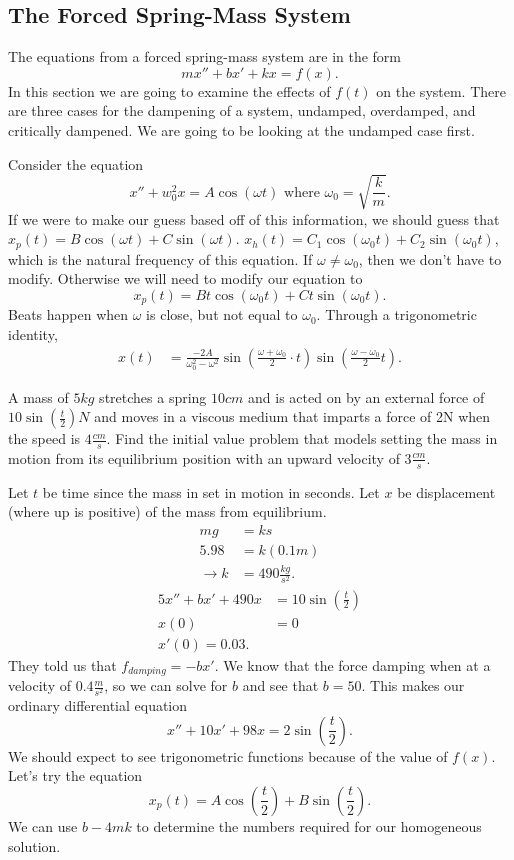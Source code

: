 \subsection{The Forced Spring-Mass System}

The equations from a forced spring-mass system are in the form 
\[
  mx''+bx'+kx=f(x)
.\] 
In this section we are going to examine the effects of $f(t)$ on the system. There are three cases for the dampening of a system, undamped, overdamped, and critically dampened. We are going to be looking at the undamped case first.
\begin{eg}
  Consider the equation 
  \[
    x''+w_0^2x=A\cos(\omega t) \text{ where $\omega_0=\sqrt{\frac{k}{m}} $}
  .\] 
  If we were to make our guess based off of this information, we should guess that $x_p(t)=B\cos(\omega t) + C\sin(\omega t)$. $x_h(t)=C_1\cos(\omega_0 t)+C_2\sin(\omega_0 t)$, which is the natural frequency of this equation. If $\omega\neq\omega_0$, then we don't have to modify. Otherwise we will need to modify our equation to 
  \[
    x_p(t)=Bt\cos(\omega_0 t)+Ct\sin(\omega_0 t)
  .\] 
  Beats happen when $\omega$ is close, but not equal to $\omega_0$. Through a trigonometric identity,
  \begin{align*}
    x(t)&=\frac{-2A}{\omega_0^2-\omega^2}\sin\left( \frac{\omega+\omega_0}{2}\cdot t \right) \sin\left( \frac{\omega-\omega_0}{2}t \right)
  .\end{align*}
\end{eg}
\begin{eg}
  A mass of $5kg$ stretches a spring $10cm$ and is acted on by an external force of $10\sin\left( \frac{t}{2} \right) N$ and moves in a viscous medium that imparts a force of 2N when the speed is $4 \frac{cm}{s}$. Find the initial value problem that models setting the mass in motion from its equilibrium position with an upward velocity of $3 \frac{cm}{s}$.\par
  Let $t$ be time since the mass in set in motion in seconds. Let $x$ be displacement (where up is positive) of the mass from equilibrium.
  \begin{align*}
    mg&=ks\\
    5.98&=k(0.1m)\\
    \to k&=490 \frac{kg}{s^2}
  .\end{align*}
  \begin{align*}
    5x''+bx'+490x&=10\sin\left( \frac{t}{2} \right) \\
    x(0)&=0\\
    x'(0)=0.03
  .\end{align*}
  They told us that $f_{damping}=-bx'$. We know that the force damping when at a velocity of $0.4 \frac{m}{s^2}$, so we can solve for $b$ and see that $b=50$. This makes our ordinary differential equation 
  \[
  x''+10x'+98x=2\sin\left( \frac{t}{2} \right) 
  .\] 
  We should expect to see trigonometric functions because of the value of $f(x)$. Let's try the equation
  \[
    x_p(t)=A\cos\left( \frac{t}{2} \right) +B\sin\left( \frac{t}{2} \right) 
  .\] 
  We can use $b-4mk$ to determine the numbers required for our homogeneous solution.
\end{eg}

